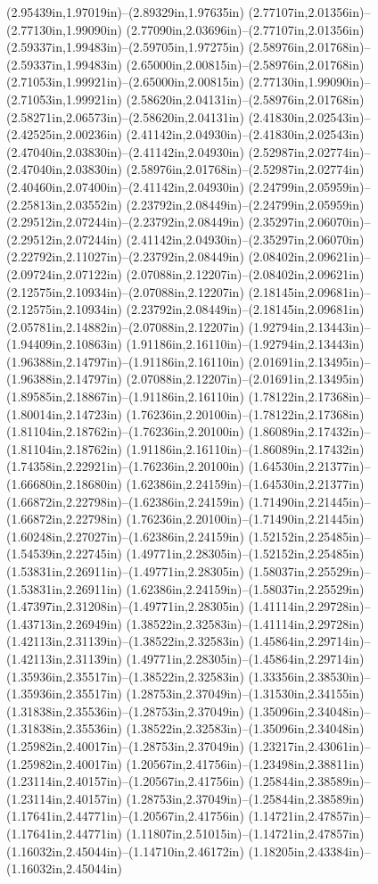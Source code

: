(2.95439in,1.97019in)--(2.89329in,1.97635in) (2.77107in,2.01356in)--(2.77130in,1.99090in) (2.77090in,2.03696in)--(2.77107in,2.01356in) (2.59337in,1.99483in)--(2.59705in,1.97275in) (2.58976in,2.01768in)--(2.59337in,1.99483in) (2.65000in,2.00815in)--(2.58976in,2.01768in) (2.71053in,1.99921in)--(2.65000in,2.00815in) (2.77130in,1.99090in)--(2.71053in,1.99921in) (2.58620in,2.04131in)--(2.58976in,2.01768in) (2.58271in,2.06573in)--(2.58620in,2.04131in) (2.41830in,2.02543in)--(2.42525in,2.00236in) (2.41142in,2.04930in)--(2.41830in,2.02543in) (2.47040in,2.03830in)--(2.41142in,2.04930in) (2.52987in,2.02774in)--(2.47040in,2.03830in) (2.58976in,2.01768in)--(2.52987in,2.02774in) (2.40460in,2.07400in)--(2.41142in,2.04930in) (2.24799in,2.05959in)--(2.25813in,2.03552in) (2.23792in,2.08449in)--(2.24799in,2.05959in) (2.29512in,2.07244in)--(2.23792in,2.08449in) (2.35297in,2.06070in)--(2.29512in,2.07244in) (2.41142in,2.04930in)--(2.35297in,2.06070in) (2.22792in,2.11027in)--(2.23792in,2.08449in) (2.08402in,2.09621in)--(2.09724in,2.07122in) (2.07088in,2.12207in)--(2.08402in,2.09621in) (2.12575in,2.10934in)--(2.07088in,2.12207in) (2.18145in,2.09681in)--(2.12575in,2.10934in) (2.23792in,2.08449in)--(2.18145in,2.09681in) (2.05781in,2.14882in)--(2.07088in,2.12207in) (1.92794in,2.13443in)--(1.94409in,2.10863in) (1.91186in,2.16110in)--(1.92794in,2.13443in) (1.96388in,2.14797in)--(1.91186in,2.16110in) (2.01691in,2.13495in)--(1.96388in,2.14797in) (2.07088in,2.12207in)--(2.01691in,2.13495in) (1.89585in,2.18867in)--(1.91186in,2.16110in) (1.78122in,2.17368in)--(1.80014in,2.14723in) (1.76236in,2.20100in)--(1.78122in,2.17368in) (1.81104in,2.18762in)--(1.76236in,2.20100in) (1.86089in,2.17432in)--(1.81104in,2.18762in) (1.91186in,2.16110in)--(1.86089in,2.17432in) (1.74358in,2.22921in)--(1.76236in,2.20100in) (1.64530in,2.21377in)--(1.66680in,2.18680in) (1.62386in,2.24159in)--(1.64530in,2.21377in) (1.66872in,2.22798in)--(1.62386in,2.24159in) (1.71490in,2.21445in)--(1.66872in,2.22798in) (1.76236in,2.20100in)--(1.71490in,2.21445in) (1.60248in,2.27027in)--(1.62386in,2.24159in) (1.52152in,2.25485in)--(1.54539in,2.22745in) (1.49771in,2.28305in)--(1.52152in,2.25485in) (1.53831in,2.26911in)--(1.49771in,2.28305in) (1.58037in,2.25529in)--(1.53831in,2.26911in) (1.62386in,2.24159in)--(1.58037in,2.25529in) (1.47397in,2.31208in)--(1.49771in,2.28305in) (1.41114in,2.29728in)--(1.43713in,2.26949in) (1.38522in,2.32583in)--(1.41114in,2.29728in) (1.42113in,2.31139in)--(1.38522in,2.32583in) (1.45864in,2.29714in)--(1.42113in,2.31139in) (1.49771in,2.28305in)--(1.45864in,2.29714in) (1.35936in,2.35517in)--(1.38522in,2.32583in) (1.33356in,2.38530in)--(1.35936in,2.35517in) (1.28753in,2.37049in)--(1.31530in,2.34155in) (1.31838in,2.35536in)--(1.28753in,2.37049in) (1.35096in,2.34048in)--(1.31838in,2.35536in) (1.38522in,2.32583in)--(1.35096in,2.34048in) (1.25982in,2.40017in)--(1.28753in,2.37049in) (1.23217in,2.43061in)--(1.25982in,2.40017in) (1.20567in,2.41756in)--(1.23498in,2.38811in) (1.23114in,2.40157in)--(1.20567in,2.41756in) (1.25844in,2.38589in)--(1.23114in,2.40157in) (1.28753in,2.37049in)--(1.25844in,2.38589in) (1.17641in,2.44771in)--(1.20567in,2.41756in) (1.14721in,2.47857in)--(1.17641in,2.44771in) (1.11807in,2.51015in)--(1.14721in,2.47857in) (1.16032in,2.45044in)--(1.14710in,2.46172in) (1.18205in,2.43384in)--(1.16032in,2.45044in) 